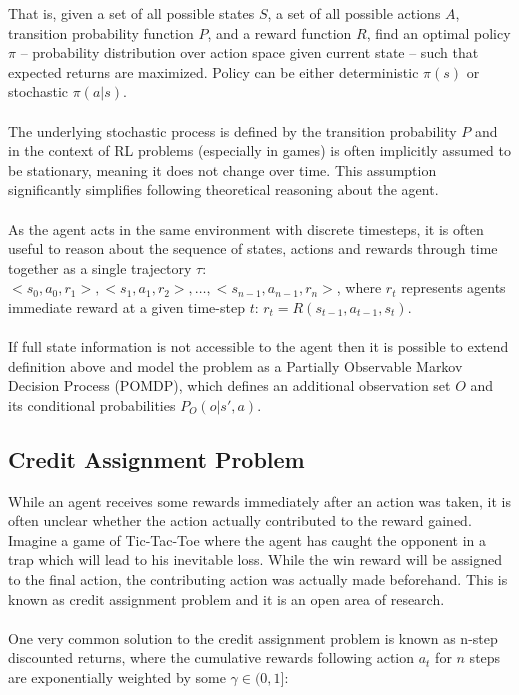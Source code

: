\noindent That is, given a set of all possible states $S$, a set of all possible actions $A$, transition probability function $P$, and a reward function $R$, find an optimal policy $\pi$ -- probability distribution over action space given current state -- such that expected returns are maximized. Policy can be either deterministic $\pi(s)$ or stochastic $\pi(a|s)$.
\\\\
The underlying stochastic process is defined by the transition probability $P$ and in the context of RL problems (especially in games) is often implicitly assumed to be stationary, meaning it does not change over time. This assumption significantly simplifies following theoretical reasoning about the agent.
\\\\
As the agent acts in the same environment with discrete timesteps, it is often useful to reason about the sequence of states, actions and rewards through time together as a single trajectory $\tau$: $<s_0, a_0, r_1>, <s_1, a_1, r_2>, \dots, <s_{n-1}, a_{n-1}, r_{n}>$, where $r_t$ represents agents immediate reward at a given time-step $t$: $r_t = R(s_{t-1}, a_{t-1}, s_{t})$.
\\\\
If full state information is not accessible to the agent then it is possible to extend definition above and model the problem as a Partially Observable Markov Decision Process (POMDP), which defines an additional observation set $O$ and its conditional probabilities $P_O(o | s', a)$.

\subsection{Credit Assignment Problem}

While an agent receives some rewards immediately after an action was taken, it is often unclear whether the action actually contributed to the reward gained. Imagine a game of Tic-Tac-Toe where the agent has caught the opponent in a trap which will lead to his inevitable loss. While the win reward will be assigned to the final action, the contributing action was actually made beforehand. This is known as credit assignment problem and it is an open area of research.
\\\\
One very common solution to the credit assignment problem is known as  n-step discounted returns, where the cumulative rewards following action $a_t$ for $n$ steps are exponentially weighted by some $\gamma \in (0, 1]$:

